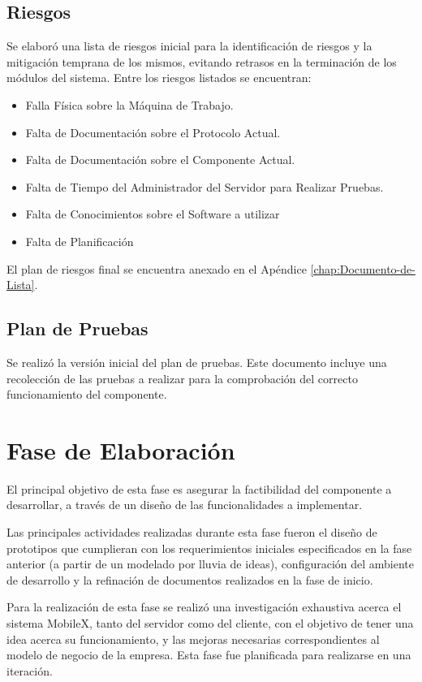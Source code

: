 \subsection{Riesgos}

Se elaboró una lista de riesgos inicial para la identificación de
riesgos y la mitigación temprana de los mismos, evitando retrasos
en la terminación de los módulos del sistema. Entre los riesgos listados
se encuentran: 
\begin{itemize}
\item Falla Física sobre la Máquina de Trabajo.
\item Falta de Documentación sobre el Protocolo Actual.
\item Falta de Documentación sobre el Componente Actual.
\item Falta de Tiempo del Administrador del Servidor para Realizar Pruebas.
\item Falta de Conocimientos sobre el Software a utilizar
\item Falta de Planificación
\end{itemize}
El plan de riesgos final se encuentra anexado en el Apéndice \ref{chap:Documento-de-Lista}. 


\subsection{Plan de Pruebas}

Se realizó la versión inicial del plan de pruebas. Este documento
incluye una recolección de las pruebas a realizar para la comprobación
del correcto funcionamiento del componente.


\section{Fase de Elaboración}

El principal objetivo de esta fase es asegurar la factibilidad del
componente a desarrollar, a través de un diseño de las funcionalidades
a implementar. 

Las principales actividades realizadas durante esta fase fueron el
diseño de prototipos que cumplieran con los requerimientos iniciales
especificados en la fase anterior (a partir de un modelado por lluvia
de ideas), configuración del ambiente de desarrollo y la refinación
de documentos realizados en la fase de inicio. 

Para la realización de esta fase se realizó una investigación exhaustiva
acerca el sistema MobileX, tanto del servidor como del cliente, con
el objetivo de tener una idea acerca su funcionamiento, y las mejoras
necesarias correspondientes al modelo de negocio de la empresa. Esta
fase fue planificada para realizarse en una iteración. 


